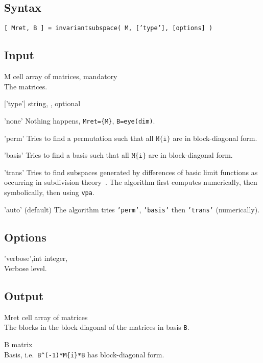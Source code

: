 \subsection*{Syntax}
\begin{param}
\item \texttt{[ Mret, B ] = invariantsubspace( M, ['type'], [options] )}
\end{param}

\subsection*{Input}
\begin{param}
\item[M] cell array of matrices, mandatory\\The matrices.
\item[{['type']}] string, , optional
    \begin{param}
    \item['none']      Nothing happens,  \texttt{Mret=\{M\}}, \texttt{B=eye(dim)}.

    \item['perm']      Tries to find a permutation such that all $\texttt{M\{i\}}$ are in block-diagonal form.
    \item['basis']     Tries to find a basis such that all $\texttt{M\{i\}}$ are in block-diagonal form.
    \item['trans']     Tries to find subspaces generated by differences of basic limit functions as occurring in subdivision theory~\cite{CP17}. The algorithm first computes numerically, then symbolically, then using \texttt{vpa}.
    \item['auto']      (default) The algorithm tries \texttt{'perm'}, \texttt{'basis'} then \texttt{'trans'} (numerically).
    \end{param}

\end{param}
\subsection*{Options}
\begin{param}
\item['verbose',int] integer, \\Verbose level.
\end{param}
\subsection*{Output}
\begin{param}
\item[Mret]   cell array of matrices\\
                The blocks in the block diagonal of the matrices in basis \texttt{B}.
\item[B]      matrix\\Basis, i.e.\ \texttt{B\^{}(-1)*M\{i\}*B} has block-diagonal form.
\end{param}

